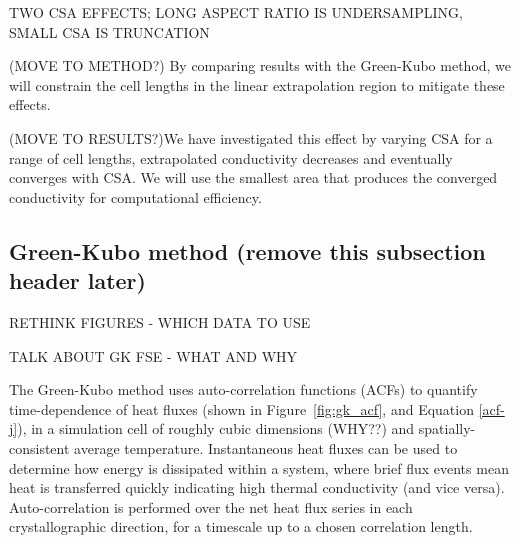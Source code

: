 \documentclass[%
preprint,                                  %
nofootinbib,
 amsmath,amssymb,
 aps,
]{revtex4-1}
\begin{document}
TWO CSA EFFECTS; LONG ASPECT RATIO IS UNDERSAMPLING, SMALL CSA IS TRUNCATION





(MOVE TO METHOD?) By comparing results with the Green-Kubo method, we will constrain the cell lengths in the linear extrapolation region to mitigate these effects. 

(MOVE TO RESULTS?)We have investigated this effect by varying CSA for a range of cell lengths, extrapolated conductivity decreases and eventually converges with CSA. We will use the smallest area that produces the converged conductivity for computational efficiency. 









\subsection{\label{sec:theory.gk}Green-Kubo method (remove this subsection header later)}

RETHINK FIGURES - WHICH DATA TO USE

TALK ABOUT GK FSE - WHAT AND WHY

The Green-Kubo method uses auto-correlation functions (ACFs) to quantify time-dependence of heat fluxes (shown in Figure~\ref{fig:gk_acf}, and Equation \ref{acf-j}), in a simulation cell of roughly cubic dimensions (WHY??) and spatially-consistent average temperature. Instantaneous heat fluxes can be used to determine how energy is dissipated within a system, where brief flux events mean heat is transferred quickly indicating high thermal conductivity (and vice versa). Auto-correlation is performed over the net heat flux series in each crystallographic direction, for a timescale up to a chosen correlation length.
\end{document}
